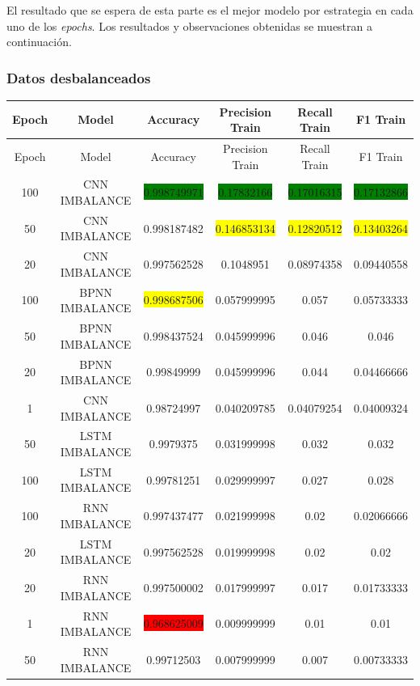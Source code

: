   El resultado que se espera de esta parte es el mejor modelo por estrategia en cada uno de los \textit{epochs}. Los resultados y observaciones obtenidas se muestran a continuaci\'{o}n.
  
  \subsubsection{Datos desbalanceados}
  \begin{longtable}{|c|c|c|c|c|c|}
  	\hline
  	Epoch & Model & Accuracy & Precision Train & Recall Train & F1 Train\\ \hline
  	\endfirsthead
  	\hline
  	Epoch & Model & Accuracy & Precision Train & Recall Train & F1 Train\\ \hline
  	\endhead
  	100 & CNN IMBALANCE & \colorbox{green}{0.998749971} & \colorbox{green}{0.17832166} & \colorbox{green}{0.17016315} & \colorbox{green}{0.17132866}\\ \hline
  	50 & CNN IMBALANCE & 0.998187482 & \colorbox{yellow}{0.146853134} & \colorbox{yellow}{0.12820512} & \colorbox{yellow}{0.13403264}\\ \hline
  	20 & CNN IMBALANCE & 0.997562528 & 0.1048951 & 0.08974358 & 0.09440558\\ \hline
  	100 & BPNN IMBALANCE & \colorbox{yellow}{0.998687506} & 0.057999995 & 0.057 & 0.05733333\\ \hline
  	50 & BPNN IMBALANCE & 0.998437524 & 0.045999996 & 0.046 & 0.046\\ \hline
  	20 & BPNN IMBALANCE & 0.99849999 & 0.045999996 & 0.044 & 0.04466666\\ \hline
  	1 & CNN IMBALANCE & 0.98724997 & 0.040209785 & 0.04079254 & 0.04009324\\ \hline
  	50 & LSTM IMBALANCE & 0.9979375 & 0.031999998 & 0.032 & 0.032\\ \hline
  	100 & LSTM IMBALANCE & 0.99781251 & 0.029999997 & 0.027 & 0.028\\ \hline
  	100 & RNN IMBALANCE & 0.997437477 & 0.021999998 & 0.02 & 0.02066666\\ \hline
  	20 & LSTM IMBALANCE & 0.997562528 & 0.019999998 & 0.02 & 0.02\\ \hline
  	20 & RNN IMBALANCE & 0.997500002 & 0.017999997 & 0.017 & 0.01733333\\ \hline
  	1 & RNN IMBALANCE & \colorbox{red}{0.968625009} & 0.009999999 & 0.01 & 0.01\\ \hline
  	50 & RNN IMBALANCE & 0.99712503 & 0.007999999 & 0.007 & 0.00733333\\ \hline

\end{longtable}
